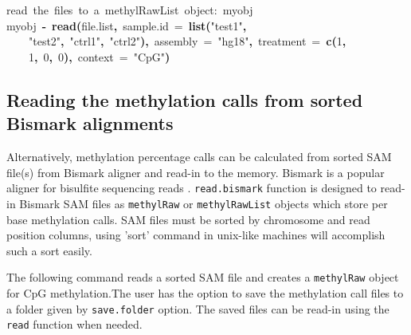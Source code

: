 \documentclass{article}
\makeatletter
\newcommand{\hlnumber}[1]{\textcolor[rgb]{0,0,0}{#1}}%
\newcommand{\hlfunctioncall}[1]{\textcolor[rgb]{.5,0,.33}{\textbf{#1}}}%
\newcommand{\hlstring}[1]{\textcolor[rgb]{.6,.6,1}{#1}}%
\newcommand{\hlkeyword}[1]{\textbf{#1}}%
\newcommand{\hlargument}[1]{\textcolor[rgb]{.69,.25,.02}{#1}}%
\newcommand{\hlcomment}[1]{\textcolor[rgb]{.18,.6,.34}{#1}}%
\newcommand{\hlassignement}[1]{\textbf{#1}}%
\newcommand{\hlsymbol}[1]{#1}%
\newcommand{\hlstd}[1]{\textcolor[rgb]{0,0,0}{#1}}%
\newenvironment{kframe}{%
 \def\FrameCommand##1{\hskip\@totalleftmargin \hskip-\fboxsep
 \colorbox{shadecolor}{##1}\hskip-\fboxsep
     \hskip-\linewidth \hskip-\@totalleftmargin \hskip\columnwidth}%
 \MakeFramed {\advance\hsize-\width
   \@totalleftmargin\z@ \linewidth\hsize
   \@setminipage}}%
 {\par\unskip\endMakeFramed}
\newenvironment{knitrout}{}{} %
\makeatother
\begin{document}
\begin{knitrout}
\begin{kframe}
\begin{flushleft}
\hlstd{}\hspace*{\fill}\\
\hlstd{}\hspace*{\fill}\\
\hlstd{}\hlcomment{\usebox{\hlnormalsizeboxhash}{\ }read{\ }the{\ }files{\ }to{\ }a{\ }methylRawList{\ }object:{\ }myobj}\hspace*{\fill}\\
\hlstd{}\hlsymbol{myobj}{\ }\hlassignement{\usebox{\hlnormalsizeboxlessthan}-}{\ }\hlfunctioncall{read}\hlkeyword{(}\hlsymbol{file.list}\hlkeyword{,}{\ }\hlargument{sample.id}{\ }\hlargument{=}{\ }\hlfunctioncall{list}\hlkeyword{(}\hlstring{"{}test1"{}}\hlkeyword{,}\hspace*{\fill}\\
\hlstd{}{\ }{\ }{\ }{\ }\hlstring{"{}test2"{}}\hlkeyword{,}{\ }\hlstring{"{}ctrl1"{}}\hlkeyword{,}{\ }\hlstring{"{}ctrl2"{}}\hlkeyword{)}\hlkeyword{,}{\ }\hlargument{assembly}{\ }\hlargument{=}{\ }\hlstring{"{}hg18"{}}\hlkeyword{,}{\ }\hlargument{treatment}{\ }\hlargument{=}{\ }\hlfunctioncall{c}\hlkeyword{(}\hlnumber{1}\hlkeyword{,}\hspace*{\fill}\\
\hlstd{}{\ }{\ }{\ }{\ }\hlnumber{1}\hlkeyword{,}{\ }\hlnumber{0}\hlkeyword{,}{\ }\hlnumber{0}\hlkeyword{)}\hlkeyword{,}{\ }\hlargument{context}{\ }\hlargument{=}{\ }\hlstring{"{}CpG"{}}\hlkeyword{)}\mbox{}
\normalfont
\end{flushleft}
\end{kframe}
\end{knitrout}


\subsection{Reading the methylation calls from sorted  Bismark alignments}
Alternatively, methylation percentage calls can be calculated from
sorted SAM file(s) from Bismark aligner and read-in to the memory. Bismark is a
popular aligner for bisulfite sequencing reads \cite{Krueger2011}. \texttt{read.bismark} function is designed to read-in Bismark SAM files as \texttt{methylRaw} or \texttt{methylRawList} objects which store per base methylation calls. SAM files must be sorted by chromosome and read position columns, using 'sort' command in unix-like machines will accomplish such a sort easily.

The following command reads a sorted SAM file and creates a \texttt{methylRaw} object for CpG methylation.The user has the option to save the methylation call files to a folder given by \texttt{save.folder} option. The saved files can be read-in using the \texttt{read} function when needed. 
\end{document}
